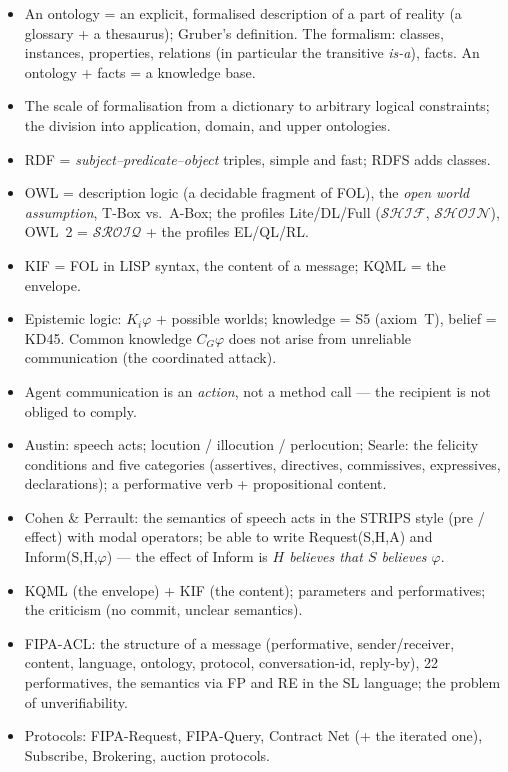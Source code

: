 \documentclass[11pt,a4paper]{article}
\theoremstyle{definition}
\begin{document}
\begin{itemize}
\item An ontology = an explicit, formalised description of a part of reality (a glossary + a
  thesaurus); Gruber's definition. The formalism: classes, instances, properties, relations
  (in particular the transitive \emph{is-a}), facts. An ontology + facts = a knowledge base.
\item The scale of formalisation from a dictionary to arbitrary logical constraints; the
  division into application, domain, and upper ontologies.
\item RDF = \emph{subject--predicate--object} triples, simple and fast; RDFS adds classes.
\item OWL = description logic (a decidable fragment of FOL), the \emph{open world assumption},
  T-Box vs.\ A-Box; the profiles Lite/DL/Full ($\mathcal{SHIF}$, $\mathcal{SHOIN}$),
  OWL~2 = $\mathcal{SROIQ}$ + the profiles EL/QL/RL.
\item KIF = FOL in LISP syntax, the content of a message; KQML = the envelope.
\item Epistemic logic: $K_i\varphi$ + possible worlds; knowledge = S5 (axiom~T), belief = KD45.
  Common knowledge $C_G\varphi$ does not arise from unreliable communication (the coordinated
  attack).
\item Agent communication is an \emph{action}, not a method call --- the recipient is not
  obliged to comply.
\item Austin: speech acts; locution / illocution / perlocution; Searle: the felicity conditions
  and five categories (assertives, directives, commissives, expressives, declarations); a
  performative verb + propositional content.
\item Cohen \& Perrault: the semantics of speech acts in the STRIPS style (pre / effect) with
  modal operators; be able to write Request(S,H,A) and Inform(S,H,$\varphi$) --- the effect of
  Inform is \emph{$H$ believes that $S$ believes $\varphi$}.
\item KQML (the envelope) + KIF (the content); parameters and performatives; the criticism
  (no commit, unclear semantics).
\item FIPA-ACL: the structure of a message (performative, sender/receiver, content, language,
  ontology, protocol, conversation-id, reply-by), 22 performatives, the semantics via FP and RE
  in the SL language; the problem of unverifiability.
\item Protocols: FIPA-Request, FIPA-Query, Contract Net (+ the iterated one), Subscribe,
  Brokering, auction protocols.
\end{itemize}
\end{document}
